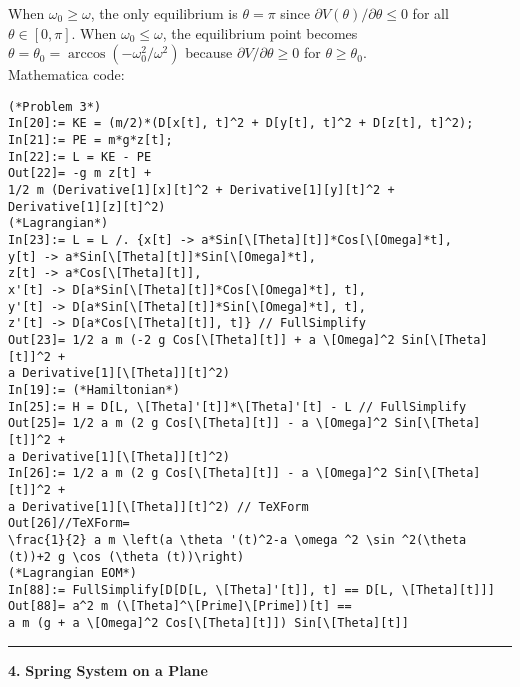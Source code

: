 \documentclass{article}
\theoremstyle{definition}
\newcommand{\p}{\partial}
\begin{document}
When $\omega_0 \geq  \omega$, the only equilibrium is $\theta=\pi$ since $\p V(\theta)/\p \theta \leq 0$ for all $\theta \in[0,\pi]$. When $\omega_0 \leq \omega$, the equilibrium point becomes $\theta = \theta_0 = \arccos(-\omega_0^2/\omega^2)$ because $\p V/\p \theta \geq 0$ for $\theta \geq \theta_0$.\\


Mathematica code:
\begin{lstlisting}
(*Problem 3*)
In[20]:= KE = (m/2)*(D[x[t], t]^2 + D[y[t], t]^2 + D[z[t], t]^2);
In[21]:= PE = m*g*z[t];
In[22]:= L = KE - PE
Out[22]= -g m z[t] + 
1/2 m (Derivative[1][x][t]^2 + Derivative[1][y][t]^2 + 
Derivative[1][z][t]^2)
(*Lagrangian*)
In[23]:= L = L /. {x[t] -> a*Sin[\[Theta][t]]*Cos[\[Omega]*t], 
y[t] -> a*Sin[\[Theta][t]]*Sin[\[Omega]*t], 
z[t] -> a*Cos[\[Theta][t]],
x'[t] -> D[a*Sin[\[Theta][t]]*Cos[\[Omega]*t], t], 
y'[t] -> D[a*Sin[\[Theta][t]]*Sin[\[Omega]*t], t], 
z'[t] -> D[a*Cos[\[Theta][t]], t]} // FullSimplify
Out[23]= 1/2 a m (-2 g Cos[\[Theta][t]] + a \[Omega]^2 Sin[\[Theta][t]]^2 + 
a Derivative[1][\[Theta]][t]^2)
In[19]:= (*Hamiltonian*)
In[25]:= H = D[L, \[Theta]'[t]]*\[Theta]'[t] - L // FullSimplify
Out[25]= 1/2 a m (2 g Cos[\[Theta][t]] - a \[Omega]^2 Sin[\[Theta][t]]^2 + 
a Derivative[1][\[Theta]][t]^2)
In[26]:= 1/2 a m (2 g Cos[\[Theta][t]] - a \[Omega]^2 Sin[\[Theta][t]]^2 + 
a Derivative[1][\[Theta]][t]^2) // TeXForm
Out[26]//TeXForm=
\frac{1}{2} a m \left(a \theta '(t)^2-a \omega ^2 \sin ^2(\theta
(t))+2 g \cos (\theta (t))\right)
(*Lagrangian EOM*)
In[88]:= FullSimplify[D[D[L, \[Theta]'[t]], t] == D[L, \[Theta][t]]]
Out[88]= a^2 m (\[Theta]^\[Prime]\[Prime])[t] == 
a m (g + a \[Omega]^2 Cos[\[Theta][t]]) Sin[\[Theta][t]]
\end{lstlisting}



\hrule

$\,$\\




\noindent \textbf{4.} \textbf{Spring System on a Plane}
\end{document}
